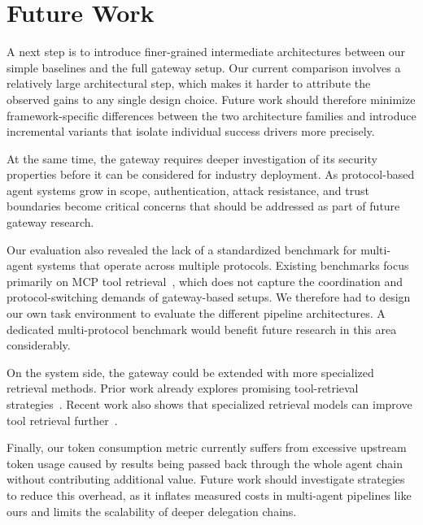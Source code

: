 \section{Future Work}

A next step is to introduce finer-grained intermediate architectures between our simple baselines and the full gateway setup. 
Our current comparison involves a relatively large architectural step, which makes it harder to attribute the observed gains to any single design choice. 
Future work should therefore minimize framework-specific differences between the two architecture families and introduce incremental variants that isolate individual success drivers more precisely.

At the same time, the gateway requires deeper investigation of its security properties before it can be considered for industry deployment. 
As protocol-based agent systems grow in scope, authentication, attack resistance, and trust boundaries become critical concerns that should be addressed as part of future gateway research.

Our evaluation also revealed the lack of a standardized benchmark for multi-agent systems that operate across multiple protocols. 
Existing benchmarks focus primarily on MCP tool retrieval~\cite{mo2026livemcpbench, luo2025mcpuniverse}, which does not capture the coordination and protocol-switching demands of gateway-based setups. 
We therefore had to design our own task environment to evaluate the different pipeline architectures. 
A dedicated multi-protocol benchmark would benefit future research in this area considerably.

On the system side, the gateway could be extended with more specialized retrieval methods.
Prior work already explores promising tool-retrieval strategies~\cite{gaurav2025dynamicreact, fei2025mcpzero, gan2025ragmcp, lumer2025tooltoagent, lumer2025scalemcp}.
Recent work also shows that specialized retrieval models can improve tool retrieval further~\cite{lu2025toolsunderdocumented}.

Finally, our token consumption metric currently suffers from excessive upstream token usage caused by results being passed back through the whole agent chain without contributing additional value. 
Future work should investigate strategies to reduce this overhead, as it inflates measured costs in multi-agent pipelines like ours and limits the scalability of deeper delegation chains.
